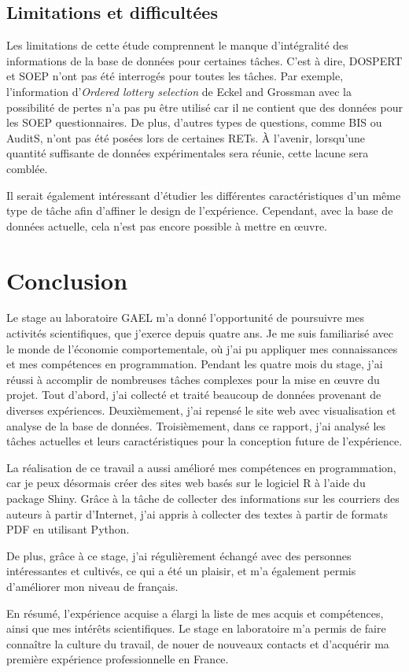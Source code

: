 \documentclass[12pt]{article}
\begin{document}
\subsection{Limitations et difficultées}

Les limitations de cette étude comprennent le manque d'intégralité des
informations de la base de données pour certaines tâches. C'est à dire,
DOSPERT et SOEP n'ont pas été interrogés pour toutes les tâches. Par
exemple, l'information d'\emph{Ordered lottery selection} de Eckel and
Grossman avec la possibilité de pertes n'a pas pu être utilisé car il ne
contient que des données pour les SOEP questionnaires. De plus, d'autres
types de questions, comme BIS ou AuditS, n'ont pas été posées lors de
certaines RETs. À l'avenir, lorsqu'une quantité suffisante de données
expérimentales sera réunie, cette lacune sera comblée.

Il serait également intéressant d'étudier les différentes
caractéristiques d'un même type de tâche afin d'affiner le design de
l'expérience. Cependant, avec la base de données actuelle, cela n'est
pas encore possible à mettre en œuvre.

\section{Conclusion}

Le stage au laboratoire GAEL m'a donné l'opportunité de poursuivre mes
activités scientifiques, que j'exerce depuis quatre ans. Je me suis
familiarisé avec le monde de l'économie comportementale, où j'ai pu
appliquer mes connaissances et mes compétences en programmation. Pendant
les quatre mois du stage, j'ai réussi à accomplir de nombreuses tâches
complexes pour la mise en œuvre du projet. Tout d'abord, j'ai collecté
et traité beaucoup de données provenant de diverses expériences.
Deuxièmement, j'ai repensé le site web avec visualisation et analyse de
la base de données. Troisièmement, dans ce rapport, j'ai analysé les
tâches actuelles et leurs caractéristiques pour la conception future de
l'expérience.

La réalisation de ce travail a aussi amélioré mes compétences en
programmation, car je peux désormais créer des sites web basés sur le
logiciel R à l'aide du package Shiny. Grâce à la tâche de collecter des
informations sur les courriers des auteurs à partir d'Internet, j'ai
appris à collecter des textes à partir de formats PDF en utilisant
Python.

De plus, grâce à ce stage, j'ai régulièrement échangé avec des personnes
intéressantes et cultivés, ce qui a été un plaisir, et m'a également
permis d'améliorer mon niveau de français.

En résumé, l'expérience acquise a élargi la liste de mes acquis et
compétences, ainsi que mes intérêts scientifiques. Le stage en
laboratoire m'a permis de faire connaître la culture du travail, de
nouer de nouveaux contacts et d'acquérir ma première expérience
professionnelle en France.



\end{document}
